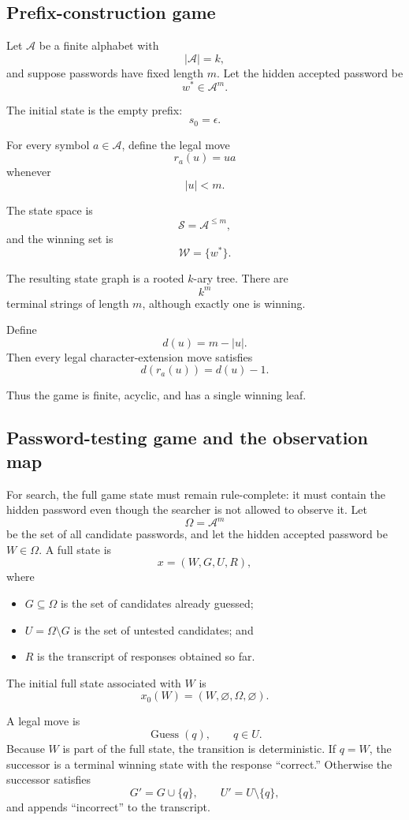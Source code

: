 \documentclass[11pt]{article}
\newcommand{\A}{\mathcal{A}}
\newcommand{\Sset}{\mathcal{S}}
\newcommand{\Wset}{\mathcal{W}}
\begin{document}
\subsection{Prefix-construction game}

Let \(\A\) be a finite alphabet with
\[
|\A|=k,
\]
and suppose passwords have fixed length \(m\). Let the hidden accepted
password be
\[
w^*\in\A^m.
\]

The initial state is the empty prefix:
\[
s_0=\epsilon.
\]

For every symbol \(a\in\A\), define the legal move
\[
r_a(u)=ua
\]
whenever
\[
|u|<m.
\]

The state space is
\[
\Sset=\A^{\le m},
\]
and the winning set is
\[
\Wset=\{w^*\}.
\]

The resulting state graph is a rooted \(k\)-ary tree. There are
\[
k^m
\]
terminal strings of length \(m\), although exactly one is winning.

Define
\[
d(u)=m-|u|.
\]
Then every legal character-extension move satisfies
\[
d(r_a(u))=d(u)-1.
\]

Thus the game is finite, acyclic, and has a single winning leaf.

\subsection{Password-testing game and the observation map}

For search, the full game state must remain rule-complete: it must contain the
hidden password even though the searcher is not allowed to observe it.  Let
\[
\Omega=\A^m
\]
be the set of all candidate passwords, and let the hidden accepted password be
\(W\in\Omega\).  A full state is
\[
x=(W,G,U,R),
\]
where
\begin{itemize}[leftmargin=2em]
    \item \(G\subseteq\Omega\) is the set of candidates already guessed;
    \item \(U=\Omega\setminus G\) is the set of untested candidates; and
    \item \(R\) is the transcript of responses obtained so far.
\end{itemize}
The initial full state associated with \(W\) is
\[
x_0(W)=(W,\varnothing,\Omega,\varnothing).
\]

A legal move is
\[
\operatorname{Guess}(q),
\qquad q\in U.
\]
Because \(W\) is part of the full state, the transition is deterministic.  If
\(q=W\), the successor is a terminal winning state with the response
``correct.''  Otherwise the successor satisfies
\[
G'=G\cup\{q\},
\qquad
U'=U\setminus\{q\},
\]
and appends ``incorrect'' to the transcript.
\end{document}
